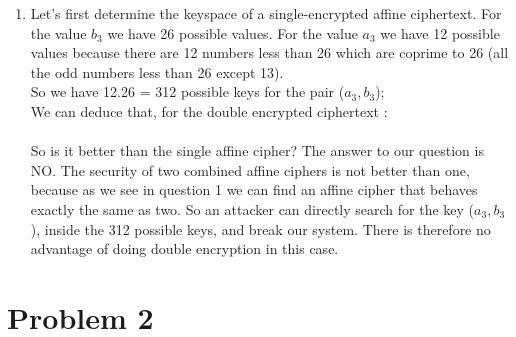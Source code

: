\documentclass[11pt]{article}
\begin{document}
\begin{enumerate}
  \item
Let's first determine the keyspace of a single-encrypted affine ciphertext.
For the value $b_3$ we have 26 possible values.
For the value $a_3$ we have 12 possible values because there are 12 numbers less than 26 which are coprime to 26 (all the odd numbers less than 26 except 13).\\
So we have 12.26 = 312 possible keys for the pair ($a_3,b_3$);\\
We can deduce that, for the double encrypted ciphertext :\\ \\
So is it better than the single affine cipher? The answer to our question is NO. The security of two combined affine ciphers is not better than one, because as we see in question 1 we can find an affine cipher that behaves exactly the same as two. So an attacker can directly search for the key ($a_3,b_3$), inside the 312 possible keys, and break our system. There is therefore no advantage of doing double encryption in this case.


\end{enumerate}

\clearpage

\section*{Problem 2}
\end{document}
